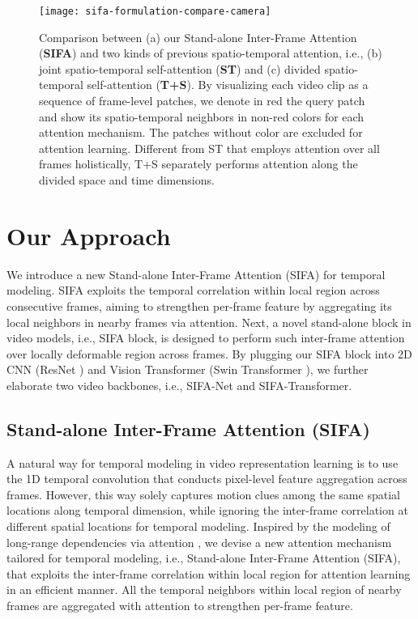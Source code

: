 \documentclass[10pt,twocolumn,letterpaper]{article}
\begin{document}
\begin{figure}[!tb]
      \vspace{-0.20in}
      \centering
      \texttt{[image: sifa-formulation-compare-camera]}
      \vspace{-0.15in}
      \caption{\small Comparison between (a) our Stand-alone Inter-Frame Attention (\textbf{SIFA}) and two kinds of previous spatio-temporal attention, i.e., (b) joint spatio-temporal self-attention (\textbf{ST}) and (c) divided spatio-temporal self-attention (\textbf{T+S}). By visualizing each video clip as a sequence of frame-level patches, we denote in red the query patch and show its spatio-temporal neighbors in non-red colors for each attention mechanism. The patches without color are excluded for attention learning.
      Different from ST that employs attention over all frames holistically, T+S separately performs attention along the divided space and time dimensions.}
      \label{fig2:1}
      \vspace{-0.25in}
\end{figure}

\section{Our Approach}
We introduce a new Stand-alone Inter-Frame Attention (SIFA) for temporal modeling. SIFA exploits the temporal correlation within local region across consecutive frames, aiming to strengthen per-frame feature by aggregating its local neighbors in nearby frames via attention. Next, a novel stand-alone block in video models, i.e., SIFA block, is designed to perform such inter-frame attention over locally deformable region across frames. By plugging our SIFA block into 2D CNN (ResNet \cite{Kaiming:CVPR16}) and Vision Transformer (Swin Transformer \cite{Swin-ViT}), we further elaborate two video backbones, i.e., SIFA-Net and SIFA-Transformer.

\subsection{Stand-alone Inter-Frame Attention (SIFA)}
A natural way for temporal modeling in video representation learning is to use the 1D temporal convolution that conducts pixel-level feature aggregation across frames. However, this way solely captures motion clues among the same spatial locations along temporal dimension, while ignoring the inter-frame correlation at different spatial locations for temporal modeling. Inspired by the modeling of long-range dependencies via attention \cite{Vaswani:NIPS17,Wang:CVPR18}, we devise a new attention mechanism tailored for temporal modeling, i.e., Stand-alone Inter-Frame Attention (SIFA), that exploits the inter-frame correlation within local region for attention learning in an efficient manner. All the temporal neighbors within local region of nearby frames are aggregated with attention to strengthen per-frame feature.
\end{document}
